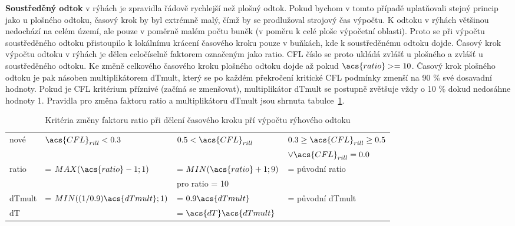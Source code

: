   {\bf Soustředěný odtok} v  rýhách je zpravidla řádově rychlejší než plošný odtok. Pokud bychom v tomto případě uplatňovali stejný princip jako u plošného odtoku, časový krok by byl extrémně malý, čímž by se prodlužoval strojový čas výpočtu. K odtoku v rýhách většinou nedochází na celém území, ale pouze v poměrně malém počtu buněk (v poměru k celé ploše výpočetní oblasti). Proto se při výpočtu soustředěného odtoku přistoupilo k lokálnímu krácení časového kroku pouze v buňkách, kde k soustředěnému odtoku dojde. Časový krok výpočtu odtoku v rýhách je dělen celočíselně faktorem označeným jako \acs{ratio}.  \acs{CFL} číslo se proto ukládá zvlášť u plošného a zvlášť u soustředěného odtoku. Ke změně celkového časového kroku plošného odtoku dojde až pokud $\acs{ratio} >= 10$. Časový krok plošného odtoku je pak násoben multiplikátorem \acs{dTmult}, který se po každém překročení kritické \acs{CFL} podmínky zmenší na 90 \% své dosavadní hodnoty. Pokud je \acs{CFL} kritérium příznivé (začíná se zmenšovat), multiplikátor \acs{dTmult} se postupně zvětšuje vždy o 10 \% dokud nedosáhne hodnoty 1. Pravidla pro změna faktoru \acs{ratio} a multiplikátoru \acs{dTmult} jsou shrnuta tabulce~\ref{tab:cflrill}.
  \begin{table}[t!]
    \centering
    \caption{Kritéria změny faktoru \acs{ratio} při dělení časového kroku pří výpočtu rýhového odtoku}
    \label{tab:cflrill}
    {\small
    \begin{tabular}{llll}
      \hline
        nové  &  $\acs{CFL}_{rill} < 0.3 $ & $ 0.5 < \acs{CFL}_{rill}$ & $ 0.3 \geq \acs{CFL}_{rill} \geq 0.5 $ \\
        & & & $\lor \acs{CFL}_{rill} = 0.0 $ \\
        \hline
        \hline
        \acs{ratio} &  = $MAX(\acs{ratio} - 1;1)$ &  = $MIN(\acs{ratio} + 1;9)$ & = původní \acs{ratio}\\
                     &                              &  pro \acs{ratio} = 10  &                            \\
        \acs{dTmult} &  = $MIN((1/0.9)\acs{dTmult};1)$ &  = $0.9\acs{dTmult}$ & = původní \acs{dTmult}\\
        \acs{dT}    &  & \multicolumn{2}{l}{= $\acs{dT}\acs{dTmult}$} \\
        \hline
        
    \end{tabular}
    }
  \end{table}
  
